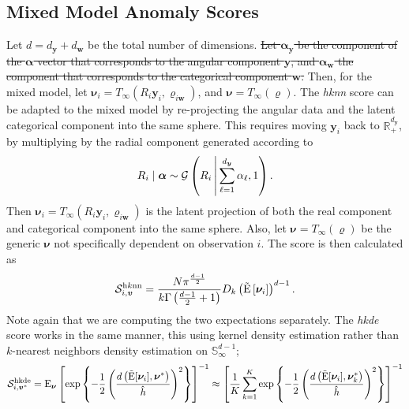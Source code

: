 \subsection{Mixed Model Anomaly Scores\label{sec:mixedscores}}
Let $d = d_{\bm{y}} + d_{\bm{w}}$ be the total number of dimensions.  \st{Let 
    $\bm{\alpha}_{\bm{y}}$ be the component of the $\bm{\alpha}$ vector that 
    corresponds  to the angular component $\bm{y}$, and $\bm{\alpha}_{\bm{w}}$ 
    the component that corresponds to the categorical component $\bm{w}$.}
    Then, for the mixed model, let 
    $\bm{\nu}_i = T_{\infty}(R_i\bm{y}_i, \bm{\varrho}_{i\bm{w}})$, and 
    $\bm{\nu} = T_{\infty}(\bm{\varrho})$.  The \emph{hknn} score can be adapted 
    to the mixed model by re-projecting the angular data and the latent 
    categorical component into the same sphere. This requires moving $\bm{y}_i$ 
    back to $\mathbb{R}_+^{d_{\bm{y}}}$, by multiplying by the radial component
    generated according to
    \begin{equation}
        \label{eqn:angularradial}
        R_i\mid\bm{\alpha} \sim \mathcal{G}
        \left(R_i\,\middle\vert\,\sum_{\ell = 1}^{d_{\bm{y}}}\alpha_{\ell}, 1\right).
    \end{equation}
    Then $\bm{\nu}_i = T_{\infty}(R_i\bm{y}_i, \bm{\varrho}_{i\bm{w}})$ is the 
    latent projection of both the real component and categorical component into 
    the same sphere.   Also, let $\bm{\nu} = T_{\infty}(\bm{\varrho})$ be the 
    generic $\bm{\nu}$ not specifically dependent on observation $i$.  The 
    score is then calculated as
    \[
        \mathcal{S}_{i,\bm{v}}^{\text{h$k$nn}} = \frac{N\pi^{\frac{d-1}{2}}}{
                k\Gamma\left(\frac{d-1}{2} + 1\right)}
        D_{k}\left(\tilde{\text{E}}\left[\bm{\nu}_i\right]\right)^{d-1}.
    \]
    Note again that we are computing the two expectations separately.  The 
    \emph{hkde} score works in the same manner, this using kernel density 
    estimation rather than $k$-nearest neighbors density estimation on 
    $\mathbb{S}_{\infty}^{d-1}$;
    \begin{equation}
        \label{eqn:adhkdecat}
        \mathcal{S}_{i,\bm{v}^*}^{\text{hkde}} = \text{E}_{\bm{\nu}}\left[\exp\left\lbrace -\frac{1}{2}
            \left(
            \frac{d\left(\tilde{\text{E}}[{\bm{\nu}_i}], \bm{\nu}^*\right)}{\hat{h}}
            \right)^2\right\rbrace
            \right]^{-1}
            \approx 
            \left[\frac{1}{K}\sum_{k = 1}^K\exp\left\lbrace
            -\frac{1}{2}
            \left(
            \frac{d\left(\tilde{\text{E}}[\bm{\nu}_i], \bm{\nu}_k^*\right)}{\hat{h}}
            \right)^2
            \right\rbrace
            \right]^{-1}
    \end{equation}
